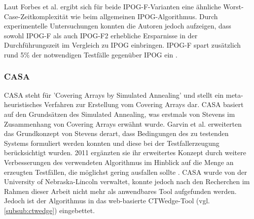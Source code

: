 Laut Forbes et al. \cite{forbes2008refining} ergibt sich für beide IPOG-F-Varianten eine ähnliche Worst-Case-Zeitkomplexität wie beim allgemeinen IPOG-Algorithmus. Durch experimentelle Untersuchungen konnten die Autoren jedoch aufzeigen, dass sowohl IPOG-F als auch IPOG-F2 erhebliche Ersparnisse in der Durchführungszeit im Vergleich zu IPOG einbringen. IPOG-F spart zusätzlich rund 5\% der notwendigen Testfälle gegenüber IPOG ein \cite{forbes2008refining}.



\subsubsection{CASA}\label{subsub:casa}

CASA \cite{garvin2009improved, garvin2011evaluating} steht für 'Covering Arrays by Simulated Annealing' und stellt ein meta-heuristisches Verfahren zur Erstellung vom Covering Arrays dar. CASA basiert auf den Grundsätzen des Simulated Annealing, was erstmals von Stevens \cite{stevens1999transversal} im Zusammenhang von Covering Arrays erwähnt wurde. Garvin et al. \cite{garvin2009improved} erweiterten das Grundkonzept von Stevens derart, dass Bedingungen des zu testenden Systems formuliert werden konnten und diese bei der Testfallerzeugung berücksichtigt wurden. 2011 ergänzten sie ihr erweitertes Konzept durch weitere Verbesserungen des verwendeten Algorithmus im Hinblick auf die Menge an erzeugten Testfällen, die möglichst gering ausfallen sollte \cite{garvin2011evaluating}. CASA wurde von der University of Nebraska-Lincoln verwaltet, konnte jedoch nach den Recherchen im Rahmen dieser Arbeit nicht mehr als anwendbares Tool aufgefunden werden. Jedoch ist der Algorithmus in das web-basierte CTWedge-Tool (vgl. \autoref{subsub:ctwedge}) eingebettet.

